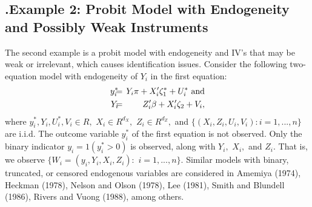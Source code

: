 \documentclass[12pt,thmsb,titlepage,final,oneside,letterpaper]{article}
\begin{document}
\subsection{\hspace{-0.2in}\textbf{.}\hspace{0.18in}Example 2: Probit Model
with Endogeneity and\newline
Possibly Weak Instruments\label{Simul Probit Ex Sec}}

\hspace{0.25in}The second example is a probit model with endogeneity and
IV's that may be weak or irrelevant, which causes identification issues.
Consider the following two-equation model with endogeneity of $Y_{i}$ in the
first equation:%
\begin{eqnarray}
y_{i}^{\ast }\hspace{-0.08in} &=&\hspace{-0.08in}Y_{i}\pi +X_{i}^{\prime
}\zeta _{1}^{\ast }+U_{i}^{\ast }\text{ and}  \notag \\
Y_{i}\hspace{-0.08in} &=&\hspace{-0.08in}Z_{i}^{\prime }\beta +X_{i}^{\prime
}\zeta _{2}+V_{i},  \label{Probit-Model}
\end{eqnarray}%
where $y_{i}^{\ast },Y_{i},U_{i}^{\ast },V_{i}\in R,$ $X_{i}\in R^{d_{X}},$ $%
Z_{i}\in R^{d_{Z}},$ and $\{(X_{i},Z_{i},U_{i},V_{i}):i=1,...,n\}$ are
i.i.d. The outcome variable $y_{i}^{\ast }$ of the first equation is not
observed. Only the binary indicator $y_{i}=1(y_{i}^{\ast }>0)$ is observed,
along with $Y_{i},$ $X_{i},$ and $Z_{i}.$ That is, we observe $%
\{W_{i}=(y_{i},Y_{i},X_{i},Z_{i}):$ $i=1,...,n\}.$ Similar models with
binary, truncated, or censored endogenous variables are considered in
Amemiya (1974), Heckman (1978), Nelson and Olson (1978), Lee (1981), Smith
and Blundell (1986), Rivers and Vuong (1988), among others.
\end{document}
